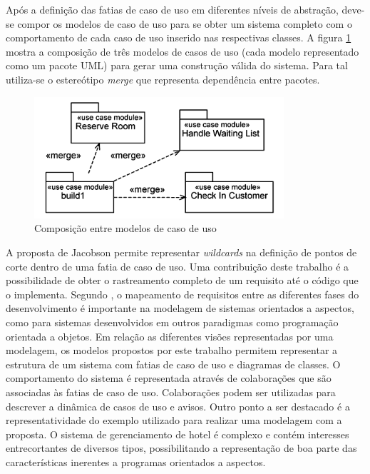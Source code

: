 Após a definição das fatias de caso de uso em diferentes níveis de abstração, deve-se compor os modelos de caso de uso para se obter um sistema
completo com o comportamento de cada caso de uso inserido nas respectivas classes. A figura \ref{fig:jacobson_use_case_merge} mostra a composição de
três modelos de casos de uso (cada modelo representado como um pacote UML) para gerar uma construção válida do sistema. Para tal utiliza-se o
estereótipo \textit{merge} que representa dependência entre pacotes.

\begin{figure}
	\centering
	\includegraphics[width=350px]{img/jacobson_use_case_merge.png}
	\caption{Composição entre modelos de caso de uso}\label{fig:jacobson_use_case_merge}
\end{figure}

A proposta de Jacobson permite representar \textit{wildcards} na definição de pontos de corte dentro de uma fatia de caso de uso. Uma contribuição deste trabalho é a possibilidade de obter o rastreamento completo de um requisito até o código que o implementa. Segundo \cite{wimmer:2011:SUA:1978802.1978807}, 
o mapeamento de requisitos entre as diferentes fases do desenvolvimento é importante na modelagem de sistemas orientados a aspectos, como para
sistemas desenvolvidos em outros paradigmas como programação orientada a objetos. Em relação as diferentes visões representadas por uma modelagem, os
modelos propostos por este trabalho permitem representar a estrutura de um sistema com fatias de caso de uso e diagramas de classes. O comportamento
do sistema é representada através de colaborações que são associadas às fatias de caso de uso. Colaborações podem ser utilizadas para descrever a
dinâmica de casos de uso e avisos. Outro ponto a ser destacado é a representatividade do exemplo utilizado para realizar uma modelagem com
a proposta. O sistema de gerenciamento de hotel é complexo e contém interesses entrecortantes de diversos tipos, possibilitando a representação de boa
parte das características inerentes a programas orientados a aspectos.

